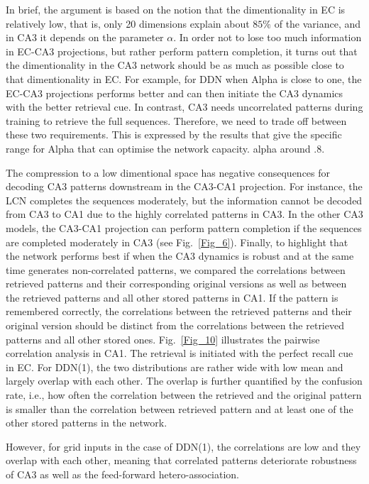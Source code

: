 \documentclass[utf8]{frontiersSCNS} %
\begin{document}
In brief, the argument is based on the notion that the dimentionality in EC is relatively low, that is, only 20 dimensions explain about $85 \%$ of the variance, and in CA3 it depends on the parameter $\alpha$. In order not to lose too much information in EC-CA3 projections, but rather perform pattern completion, it turns out that the dimentionality in the CA3 network should be as much as possible close to that dimentionality in EC. For example, for DDN when Alpha is close to one, the EC-CA3 projections performs better and can then initiate the CA3 dynamics with the better retrieval cue. In contrast, CA3 needs uncorrelated patterns during training to retrieve the full sequences.  Therefore, we need to trade off between these two requirements. This is expressed by the results that give the specific range for Alpha that can optimise the network capacity. alpha around .8. 
%

The compression to a low dimentional space has negative consequences for decoding CA3 patterns downstream in the CA3-CA1 projection. For instance, the LCN completes the sequences moderately, but the information cannot be decoded from CA3 to CA1 due to the highly correlated patterns in CA3. In the other CA3 models, the CA3-CA1 projection can perform pattern completion if the sequences are completed moderately in CA3 (see Fig.~\ref{Fig_6}). Finally, to highlight that the network performs best if when the CA3 dynamics is robust and at the same time generates non-correlated patterns, we compared the correlations between retrieved patterns and their corresponding original versions as well as between the retrieved patterns and all other stored patterns in CA1. If the pattern is remembered correctly, the correlations between the retrieved patterns and their original version should be distinct from the correlations between the retrieved patterns and all other stored ones. Fig.~\ref{Fig_10} illustrates the pairwise correlation analysis in CA1. The retrieval is initiated with the perfect recall cue in EC. For DDN(1), the two distributions are rather wide with low mean and largely overlap with each other. The overlap is further quantified by the confusion rate, i.e., how often the correlation between the retrieved and the original pattern is smaller than the correlation between retrieved pattern and at least one of the other stored patterns in the network.

However, for grid inputs in the case of DDN(1), the correlations are low and they overlap with each other, meaning that correlated patterns deteriorate robustness of CA3 as well as the feed-forward hetero-association.
\end{document}
